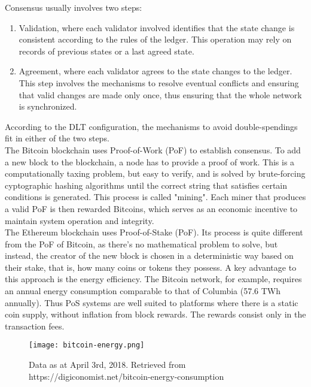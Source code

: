 Consensus usually involves two steps:
\begin{enumerate}
    \item Validation, where each validator involved identifies that the state change is consistent according to the rules of the ledger. This operation may rely on records of previous states or a last agreed state.
    \item Agreement, where each validator agrees to the state changes to the ledger. This step involves the mechanisms to resolve eventual conflicts and ensuring that valid changes are made only once, thus ensuring that the whole network is synchronized.
\end{enumerate}

According to the DLT configuration, the mechanisms to avoid double-spendings fit in either of the two steps. \\

The Bitcoin blockchain uses Proof-of-Work (PoF) to establish consensus. To add a new block to the blockchain, a node has to provide a proof of work. This is a computationally taxing problem, but easy to verify, and is solved by brute-forcing cyptographic hashing algorithms until the correct string that satisfies certain conditions is generated. This process is called "mining". Each miner that produces a valid PoF is then rewarded Bitcoins, which serves as an economic incentive to maintain system operation and integrity.\\

The Ethereum blockchain uses Proof-of-Stake (PoF). Its process is quite different from the PoF of Bitcoin, as there's no mathematical problem to solve, but instead, the creator of the new block is chosen in a deterministic way based on their stake, that is, how many coins or tokens they possess. 
A key advantage to this approach is the energy efficiency. The Bitcoin network, for example, requires an annual energy consumption comparable to that of Columbia (57.6 TWh annually). 
Thus PoS systems are well suited to platforms where there is a static coin supply, without inflation from block rewards. The rewards consist only in the transaction fees. \\

\begin{figure}[h]
    \centering
    \texttt{[image: bitcoin-energy.png]}
    \caption{
        Data as at April 3rd, 2018. Retrieved from https://digiconomist.net/bitcoin-energy-consumption}
\end{figure}

